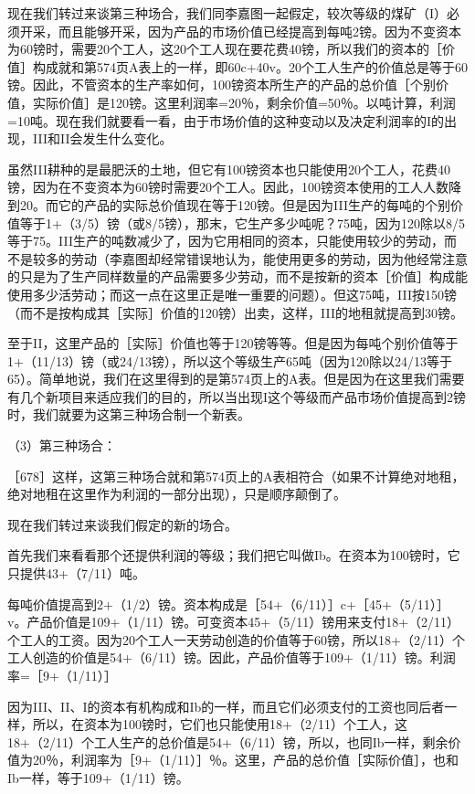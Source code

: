 现在我们转过来谈第三种场合，我们同李嘉图一起假定，较次等级的煤矿（I）必须开采，而且能够开采，因为产品的市场价值已经提高到每吨2镑。因为不变资本为60镑时，需要20个工人，这20个工人现在要花费40镑，所以我们的资本的［价值］构成就和第574页A表上的一样，即60c+40v。20个工人生产的价值总是等于60镑。因此，不管资本的生产率如何，100镑资本所生产的产品的总价值［个别价值，实际价值］是120镑。这里利润率=20％，剩余价值=50％。以吨计算，利润=10吨。现在我们就要看一看，由于市场价值的这种变动以及决定利润率的I的出现，III和II会发生什么变化。

虽然III耕种的是最肥沃的土地，但它有100镑资本也只能使用20个工人，花费40镑，因为在不变资本为60镑时需要20个工人。因此，100镑资本使用的工人人数降到20。而它的产品的实际总价值现在等于120镑。但是因为III生产的每吨的个别价值等于1+（3/5）镑（或8/5镑），那末，它生产多少吨呢？75吨，因为120除以8/5等于75。III生产的吨数减少了，因为它用相同的资本，只能使用较少的劳动，而不是较多的劳动（李嘉图却经常错误地认为，能使用更多的劳动，因为他经常注意的只是为了生产同样数量的产品需要多少劳动，而不是按新的资本［价值］构成能使用多少活劳动；而这一点在这里正是唯一重要的问题）。但这75吨，III按150镑（而不是按构成其［实际］价值的120镑）出卖，这样，III的地租就提高到30镑。

至于II，这里产品的［实际］价值也等于120镑等等。但是因为每吨个别价值等于1+（11/13）镑（或24/13镑），所以这个等级生产65吨（因为120除以24/13等于65）。简单地说，我们在这里得到的是第574页上的A表。但是因为在这里我们需要有几个新项目来适应我们的目的，所以当出现I这个等级而产品市场价值提高到2镑时，我们就要为这第三种场合制一个新表。

（3）第三种场合：

\todo{}

［678］这样，这第三种场合就和第574页上的A表相符合（如果不计算绝对地租，绝对地租在这里作为利润的一部分出现），只是顺序颠倒了。

现在我们转过来谈我们假定的新的场合。

首先我们来看看那个还提供利润的等级；我们把它叫做Ib。在资本为100镑时，它只提供43+（7/11）吨。

每吨价值提高到2+（1/2）镑。资本构成是［54+（6/11）］c+［45+（5/11）］v。产品价值是109+（1/11）镑。可变资本45+（5/11）镑用来支付18+（2/11）个工人的工资。因为20个工人一天劳动创造的价值等于60镑，所以18+（2/11）个工人创造的价值是54+（6/11）镑。因此，产品价值等于109+（1/11）镑。利润率=［9+（1/11）］%

因为III、II、I的资本有机构成和Ib的一样，而且它们必须支付的工资也同后者一样，所以，在资本为100镑时，它们也只能使用18+（2/11）个工人，这18+（2/11）个工人生产的总价值是54+（6/11）镑，所以，也同Ib一样，剩余价值为20％，利润率为［9+（1/11）］％。这里，产品的总价值［实际价值］，也和Ib一样，等于109+（1/11）镑。

